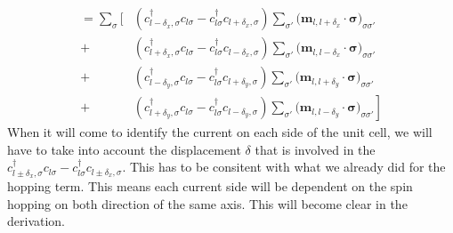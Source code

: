 \documentclass[../main.tex]{subfile}
\begin{document}
\begin{equation}\label{eq:CurrentAltermagCommu}
    \begin{aligned}
        = \sum_{\sigma}\Biggl[&
                \left(c_{l-\delta_x,\sigma}^{\dagger}c_{l\sigma} - c_{l\sigma}^{\dagger}c_{l+\delta_x,\sigma} \right) 
                    \sum_{\sigma'}\bigl(\bm{m}_{l,l+\delta_x}\cdot\bm{\sigma}\bigr)_{\sigma\sigma'}\\
                +&\left(c_{l+\delta_x,\sigma}^{\dagger}c_{l\sigma} - c_{l\sigma}^{\dagger}c_{l-\delta_x,\sigma} \right) 
                    \sum_{\sigma'}\bigl(\bm{m}_{l,l-\delta_x}\cdot\bm{\sigma}\bigr)_{\sigma\sigma'}\\
                +&\left(c_{l-\delta_y,\sigma}^{\dagger}c_{l\sigma} - c_{l\sigma}^{\dagger}c_{l+\delta_y,\sigma} \right) 
                    \sum_{\sigma'}\bigl(\bm{m}_{l,l+\delta_y}\cdot\bm{\sigma}\bigr)_{\sigma\sigma'}\\
                +&\left.\left(c_{l+\delta_y,\sigma}^{\dagger}c_{l\sigma} - c_{l\sigma}^{\dagger}c_{l-\delta_y,\sigma} \right) 
                    \sum_{\sigma'}\bigl(\bm{m}_{l,l-\delta_y}\cdot\bm{\sigma}\bigr)_{\sigma\sigma'}\right]
    \end{aligned}
\end{equation} 
When it will come to identify the current on each side of the unit cell, we will have to take into account the displacement $\delta$ that is involved in the 
$c_{l\pm\delta_x,\sigma}^{\dagger}c_{l\sigma} -c_{l\sigma}^{\dagger}c_{l\pm\delta_x,\sigma}$.
This has to be consitent with what we already did for the hopping term. This means each current side will be dependent on the spin hopping on both direction of the same axis.
This will become clear in the derivation.\\
\end{document}
